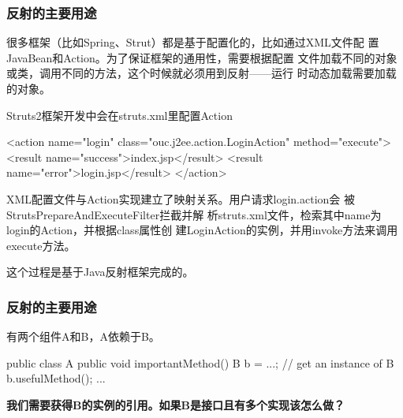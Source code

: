 \begin{frame}[fragile] %
  \frametitle{反射的主要用途}


  很多框架（比如Spring、Strut）都是基于配置化的，比如通过XML文件配
  置JavaBean和Action。为了保证框架的通用性，需要根据配置
  文件加载不同的对象或类，调用不同的方法，这个时候就必须用到反射——{\hei\Red 运行
    时动态加载需要加载的对象}。

   {\kai Struts2框架开发中会在struts.xml里配置Action}

  \begin{xmlCode}
    <action name="login" class="ouc.j2ee.action.LoginAction" method="execute">
      <result name="success">index.jsp</result>
      <result name="error">login.jsp</result>
    </action>
  \end{xmlCode}
  
  {\small\Blue XML配置文件与Action实现建立了映射关系。用户请求login.action会
  被StrutsPrepareAndExecuteFilter拦截并解
  析struts.xml文件，检索其中name为login的Action，并根据class属性创
  建LoginAction的实例，并用invoke方法来调用execute方法。}

  {\Red 这个过程是基于Java反射框架完成的}。

\end{frame}

\begin{frame}[fragile] %
  \frametitle{反射的主要用途}


  有两个组件A和B，A依赖于B。

  \begin{javaCode}
    public class A {
      public void importantMethod() {
        B b = ...; // get an instance of B
        b.usefulMethod();
        ...
      }
    }
  \end{javaCode}

  {\bf\Red 我们需要获得B的实例的引用。如果B是接口且有多个实现该怎么做？}

\end{frame}

